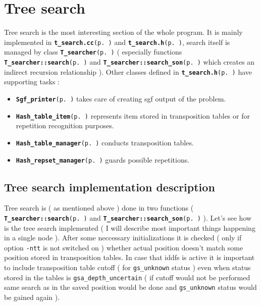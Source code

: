 \section{Tree search}\label{page_3}
Tree search is the most interesting section of the whole program. It is mainly implemented in {\tt {\bf t\_\-search.cc}{\rm (p.\,\pageref{t__search_8cc})}} and {\tt {\bf t\_\-search.h}{\rm (p.\,\pageref{t__search_8h})}}, search itself is managed by class {\tt {\bf T\_\-searcher}{\rm (p.\,\pageref{classT__searcher})}} ( especially functions {\tt {\bf T\_\-searcher::search}{\rm (p.\,\pageref{classT__searcher_a0})}} and {\tt {\bf T\_\-searcher::search\_\-son}{\rm (p.\,\pageref{classT__searcher_a11})}} which creates an indirect recursion relationship ). Other classes defined in {\tt {\bf t\_\-search.h}{\rm (p.\,\pageref{t__search_8h})}} have supporting tasks :\begin{itemize}
\item {\tt {\bf Sgf\_\-printer}{\rm (p.\,\pageref{classSgf__printer})}} takes care of creating sgf output of the problem.\item {\tt {\bf Hash\_\-table\_\-item}{\rm (p.\,\pageref{classHash__table__item})}} represents item stored in transposition tables or for repetition recognition purposes.\item {\tt {\bf Hash\_\-table\_\-manager}{\rm (p.\,\pageref{classHash__table__manager})}} conducts transposition tables.\item {\tt {\bf Hash\_\-repset\_\-manager}{\rm (p.\,\pageref{classHash__repset__manager})}} guards possible repetitions.\end{itemize}
\subsection{Tree search implementation description}\label{page_3_page_3__sec_1}
Tree search is ( as mentioned above ) done in two functions ( {\tt {\bf T\_\-searcher::search}{\rm (p.\,\pageref{classT__searcher_a0})}} and {\tt {\bf T\_\-searcher::search\_\-son}{\rm (p.\,\pageref{classT__searcher_a11})}} ). Let's see how is the tree search implemented ( I will describe most important things happening in a single node ). After some neccessary initializations it is checked ( only if option {\tt -ntt} is not switched on ) whether actual position doesn't match some position stored in transposition tables. In case that iddfs is active it is important to include transposition table cutoff ( for {\tt gs\_\-unknown} status ) even when status stored in the tables is {\tt gsa\_\-depth\_\-uncertain} ( if cutoff would not be performed same search as in the saved position would be done and {\tt gs\_\-unknown} status would be gained again ).



